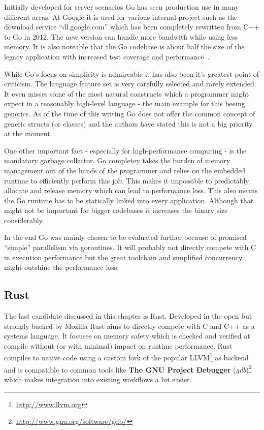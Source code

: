 Initially developed for server scenarios Go has seen production use in many different areas. At Google it is used for various internal project such as the download service ``dl.google.com'' which has been completely rewritten from C++ to Go in 2012. The new version can handle more bandwith while using less memory. It is also noteable that the Go codebase is about half the size of the legacy application with increased test coverage and performance~\cite{go_dl_google}.

While Go's focus on simplicity is admireable it has also been it's greatest point of criticism. The language feature set is very carefully selected and rarely extended. It even misses some of the most natural constructs which a programmer might expect in a reasonably high-level language - the main example for this beeing generics. As of the time of this writing Go does not offer the common concept of generic structs (or classes) and the authors have stated this is not a big priority at the moment.

One other important fact - especially for high-performance computing - is the mandatory garbage collector. Go completey takes the burden of memory management out of the hands of the programmer and relies on the embedded runtime to efficiently perform this job. This makes it impossible to predictably allocate and release memory which can lead to performance loss. This also means the Go runtime has to be statically linked into every application. Although that might not be important for bigger codebases it increases the binary size considerably.

In the end Go was mainly chosen to be evaluated further because of promised ``simple'' parallelism via goroutines. It will probably not directly compete with C in execution performance but the great toolchain and simplified concurrency might outshine the performance loss.



\subsection*{Rust}
\label{subsec:State_of_the_art::Candidates::Rust}

The last candidate discussed in this chapter is Rust. Developed in the open but strongly backed by Mozilla Rust aims to directly compete with C and C++ as a systems language. It focuses on memory safety which is checked and verified at compile without (or with minimal) impact on runtime performance. Rust compiles to native code using a custom fork of the popular LLVM\footnote{\url{http://www.llvm.org}} as backend and is compatible to common tools like \textbf{The GNU Project Debugger} (\textit{gdb})\footnote{\url{http://www.gnu.org/software/gdb/}} which makes integration into existing workflows a bit easier.

